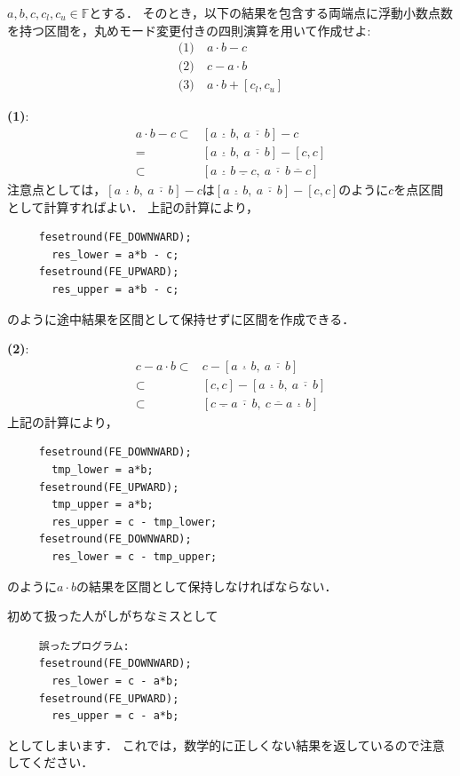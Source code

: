\Mondai
$a, b, c, c_l, c_u \in {\mathbb F}$とする．
そのとき，以下の結果を包含する両端点に浮動小数点数を持つ区間を，丸めモード変更付きの四則演算を用いて作成せよ:
\begin{align*}
	\mbox{(1)}& ~ a \cdot b - c \\
	\mbox{(2)}& ~c - a \cdot b \\
	\mbox{(3)}& ~a \cdot b + [ c_l, c_u ]
\end{align*}

\vspace{5mm}

\Kaitourei
\noindent\textbf{(1)}:
\begin{align*}
	a \cdot b - c \subset& [ a ~ \underline{\cdot} ~ b, ~ a ~ \overline{\cdot} ~ b  ] - c \\
	=& [ a ~ \underline{\cdot} ~ b, ~ a ~ \overline{\cdot} ~ b  ] - [c, c] \\
	\subset&  [ a ~ \underline{\cdot} ~ b ~ \underline{-} ~ c , ~ a ~ \overline{\cdot} ~ b ~ \overline{-} ~ c  ]
\end{align*}
注意点としては，$[ a ~ \underline{\cdot} ~ b, ~ a ~ \overline{\cdot} ~ b  ] - c$は$[ a ~ \underline{\cdot} ~ b, ~ a ~ \overline{\cdot} ~ b  ] - [c, c]$のように$c$を点区間として計算すればよい．
上記の計算により，
\begin{verbatim}
     fesetround(FE_DOWNWARD);
       res_lower = a*b - c;
     fesetround(FE_UPWARD);
       res_upper = a*b - c;
\end{verbatim}
のように途中結果を区間として保持せずに区間を作成できる．

\medskip\noindent\textbf{(2)}:
\begin{align*}
	c - a \cdot b \subset& c - [ a ~ \underline{\cdot} ~ b, ~ a ~ \overline{\cdot} ~ b  ]  \\
        \subset& [c, c] - [ a ~ \underline{\cdot} ~ b, ~ a ~ \overline{\cdot} ~ b  ]  \\
	\subset&  [ c ~ \underline{-} ~ a ~ \overline{\cdot} ~ b , ~ c ~ \overline{-} ~a ~ \underline{\cdot} ~ b  ]
\end{align*}
上記の計算により，
\begin{verbatim}
     fesetround(FE_DOWNWARD);
       tmp_lower = a*b;
     fesetround(FE_UPWARD);
       tmp_upper = a*b;
       res_upper = c - tmp_lower;
     fesetround(FE_DOWNWARD);
       res_lower = c - tmp_upper;
\end{verbatim}
のように$a \cdot b$の結果を区間として保持しなければならない．

初めて扱った人がしがちなミスとして
\begin{verbatim}
     誤ったプログラム:
     fesetround(FE_DOWNWARD);
       res_lower = c - a*b;
     fesetround(FE_UPWARD);
       res_upper = c - a*b;
\end{verbatim}
としてしまいます．
これでは，数学的に正しくない結果を返しているので注意してください．

